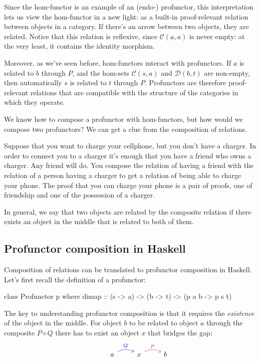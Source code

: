 \documentclass[DaoFP]{subfiles}
\begin{document}
Since the hom-functor is an example of an (endo-) profunctor, this interpretation lets us view the hom-functor in a new light: as a built-in proof-relevant relation between objects in a category. If there's an arrow between two objects, they are related. Notice that this relation is reflexive, since $\mathcal{C}(a, a)$ is never empty: at the very least, it contains the identity morphism. 

Moreover, as we've seen before, hom-functors interact with profunctors. If $a$ is related to $b$ through $P$, and the hom-sets $\mathcal{C}(s, a)$ and $\mathcal{D}(b, t)$ are non-empty, then automatically $s$ is related to $t$ through $P$. Profunctors are therefore proof-relevant relations that are compatible with the structure of the categories in which they operate.

We know how to compose a profunctor with hom-functors, but how would we compose two profunctors? We can get a clue from the composition of relations. 

Suppose that you want to charge your cellphone, but you don't have a charger. In order to connect you to a charger it's enough that you have a friend who owns a charger. Any friend will do. You compose the relation of having a friend with the relation of a person having a charger to get a relation of being able to charge your phone. The proof that you can charge your phone is a pair of proofs, one of friendship and one of the possession of a charger. 

In general, we say that two objects are related by the composite relation if there exists an object in the middle that is related to both of them. 

\subsection{Profunctor composition in Haskell}

Composition of relations can be translated to profunctor composition in Haskell. Let's first recall the definition of a profunctor:
\begin{haskell}
class Profunctor p where
  dimap :: (s -> a) -> (b -> t) -> (p a b -> p s t)
\end{haskell}

The key to understanding profunctor composition is that it requires the \emph{existence} of the object in the middle. For object $b$ to be related to object $a$ through the composite $P \diamond Q$ there has to exist an object $x$ that bridges the gap:
\[
 \begin{tikzcd}
  & a
  \arrow[r, bend left, blue, "Q"]
 & x
  \arrow[r, bend left, red, "P"]
 & b
  \end{tikzcd}
\]
\end{document}
